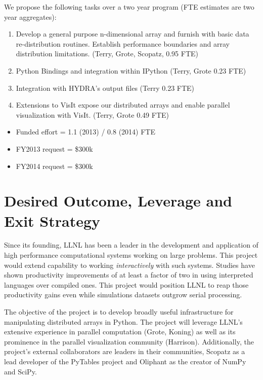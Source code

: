 \documentclass[letterpaper,11pt]{article}
\begin{document}
We propose the following tasks over a two year program (FTE estimates are two year aggregates):

\begin{enumerate}
	\item Develop a general purpose n-dimensional array and furnish with basic data 
		re-distribution routines.  Establish performance boundaries and array distribution 
		limitations. (Terry, Grote, Scopatz, 0.95 FTE) 

	\item Python Bindings and integration within IPython (Terry, Grote 0.23 FTE)

	\item Integration with HYDRA's output files (Terry 0.23 FTE)

	\item Extensions to VisIt expose our distributed arrays and enable parallel visualization 
		with VisIt. (Terry, Grote 0.49 FTE)

\end{enumerate}

\begin{itemize}
	\setlength{\itemsep}{0pt}
	\setlength{\parskip}{0pt}
	\setlength{\parsep}{0pt}

	\item Funded effort = 1.1 (2013) / 0.8 (2014) FTE
	\item FY2013 request =  \$300k
	\item FY2014 request =  \$300k
\end{itemize}


\section*{Desired Outcome, Leverage and Exit Strategy}

Since its founding, LLNL has been a leader in the development and application of high 
performance computational systems working on large problems.  This project would extend 
capability to working \emph{interactively} with such systems.  Studies have shown productivity 
improvements of at least a factor of two\cite{Prechelt2000} in using interpreted languages 
over compiled ones.  This project would position LLNL to reap those productivity gains even 
while simulations datasets outgrow serial processing.

The objective of the project is to develop broadly useful infrastructure for manipulating 
distributed arrays in Python.  The project will leverage LLNL's extensive experience in 
parallel computation (Grote, Koning) as well as its prominence in the parallel visualization 
community (Harrison).  Additionally, the project's external collaborators are leaders in their 
communities, Scopatz as a lead developer of the PyTables project and Oliphant as the creator of 
NumPy and SciPy.
\end{document}
